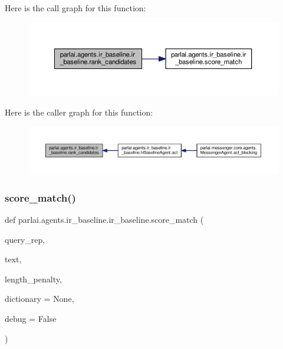 Here is the call graph for this function\+:
\nopagebreak
\begin{figure}[H]
\begin{center}
\leavevmode
\includegraphics[width=350pt]{namespaceparlai_1_1agents_1_1ir__baseline_1_1ir__baseline_a995475fdd96a7bbd8886a3ebcfa56156_cgraph}
\end{center}
\end{figure}
Here is the caller graph for this function\+:
\nopagebreak
\begin{figure}[H]
\begin{center}
\leavevmode
\includegraphics[width=350pt]{namespaceparlai_1_1agents_1_1ir__baseline_1_1ir__baseline_a995475fdd96a7bbd8886a3ebcfa56156_icgraph}
\end{center}
\end{figure}
\mbox{\label{namespaceparlai_1_1agents_1_1ir__baseline_1_1ir__baseline_a64aaaccb38f5dd5f51c09439456b2f6e}} 
\subsubsection{\texorpdfstring{score\+\_\+match()}{score\_match()}}
{\footnotesize\ttfamily def parlai.\+agents.\+ir\+\_\+baseline.\+ir\+\_\+baseline.\+score\+\_\+match (\begin{DoxyParamCaption}\item[{}]{query\+\_\+rep,  }\item[{}]{text,  }\item[{}]{length\+\_\+penalty,  }\item[{}]{dictionary = {\ttfamily None},  }\item[{}]{debug = {\ttfamily False} }\end{DoxyParamCaption})}

